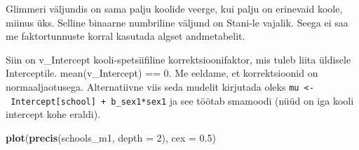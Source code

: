 \documentclass[]{book}
\newenvironment{Shaded}{\begin{snugshade}}{\end{snugshade}}
\newcommand{\CommentTok}[1]{\textcolor[rgb]{0.56,0.35,0.01}{\textit{#1}}}
\newcommand{\DataTypeTok}[1]{\textcolor[rgb]{0.13,0.29,0.53}{#1}}
\newcommand{\DecValTok}[1]{\textcolor[rgb]{0.00,0.00,0.81}{#1}}
\newcommand{\FloatTok}[1]{\textcolor[rgb]{0.00,0.00,0.81}{#1}}
\newcommand{\KeywordTok}[1]{\textcolor[rgb]{0.13,0.29,0.53}{\textbf{#1}}}
\newcommand{\NormalTok}[1]{#1}
\newcommand{\OperatorTok}[1]{\textcolor[rgb]{0.81,0.36,0.00}{\textbf{#1}}}
\newcommand{\StringTok}[1]{\textcolor[rgb]{0.31,0.60,0.02}{#1}}
\begin{document}
Glimmeri väljundis on sama palju koolide veerge, kui palju on erinevaid koole, miinus üks. Selline binaarne numbriline väljund on Stani-le vajalik. Seega ei saa me faktortunnuste korral kasutada algset andmetabelit.

\begin{Shaded}
\end{Shaded}

\begin{Shaded}
\end{Shaded}

Siin on v\_Intercept kooli-spetsiifiline korrektsioonifaktor, mis tuleb liita üldisele Interceptile. mean(v\_Intercept) == 0. Me eeldame, et korrektsioonid on normaaljaotusega.
Alternatiivne viis seda mudelit kirjutada oleks \texttt{mu\ \textless{}-\ Intercept{[}school{]}\ +\ b\_sex1*sex1} ja see töötab smamoodi (nüüd on iga kooli intercept kohe eraldi).

\begin{Shaded}
\begin{Highlighting}[]
\KeywordTok{plot}\NormalTok{(}\KeywordTok{precis}\NormalTok{(schools_m1, }\DataTypeTok{depth =} \DecValTok{2}\NormalTok{), }\DataTypeTok{cex =} \FloatTok{0.5}\NormalTok{)}
\end{Highlighting}
\end{Shaded}
\end{document}
